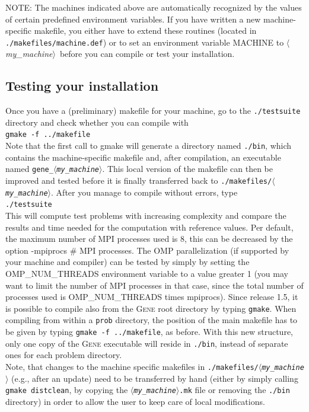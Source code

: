 \documentclass[12pt]{article}
\newcommand{\mach}{$\langle$\textsl{my\_machine}$\rangle$}
\begin{document}
NOTE: The machines indicated above are automatically recognized by the values of certain predefined
environment variables. If you have written a new machine-specific makefile, you either have to
extend these routines (located in {\tt ./makefiles/machine.def})
or to set an environment variable MACHINE to \mach\ before you can compile or test your installation.

\subsection{Testing your installation}
Once you have a (preliminary) makefile for your machine, go to the \texttt{./testsuite} directory
and check whether you can compile with\\
\qquad\verb|gmake -f ../makefile| \\
Note that the first call to gmake will generate a directory named \texttt{./bin}, which contains
the machine-specific makefile and, after compilation, an executable named \texttt{gene\_\mach}.
This local version of the makefile can then be improved and tested before it is finally transferred back to
\texttt{./makefiles/\mach}.
After you manage to compile without errors, type \\
\qquad\verb|./testsuite| \\
This will compute test problems with increasing complexity and
compare the results and time needed for the computation with reference values.
Per default, the maximum number of MPI processes used is 8, this can be decreased by the option
-mpiprocs \# MPI processes. The OMP parallelization (if supported by your machine and compiler) can
be tested by simply by setting the OMP\_NUM\_THREADS environment variable to a value greater 1 (you
may want to limit the number of MPI processes in that case, since the total number of processes used is
OMP\_NUM\_THREADS times mpiprocs).
Since release 1.5, it is possible to compile also from the \textsc{Gene} root directory
by typing \verb|gmake|. When compiling from within a \texttt{prob} directory, the position of the main
makefile has to be given by typing \verb|gmake -f ../makefile|, as before. With this new structure,
only one copy of the \textsc{Gene} executable will reside in \texttt{./bin}, instead of
separate ones for each problem directory. \\
Note, that changes to the machine specific makefiles in \texttt{./makefiles/\mach}
(e.g., after an update) need to be transferred by hand (either by simply calling \texttt{gmake distclean},
by copying the \texttt{\mach .mk} file or removing the \texttt{./bin} directory) in order to allow 
the user to keep care of local modifications.
\end{document}
